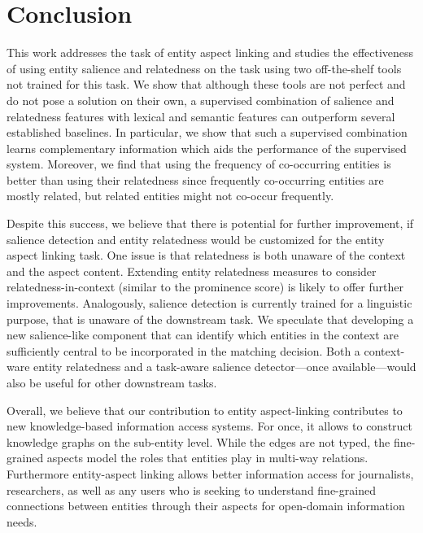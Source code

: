 \section{Conclusion}
\label{sec:Conclusion}
This work addresses the task of entity aspect linking and studies the effectiveness of using entity salience and relatedness on the task using two off-the-shelf tools not trained for this task. We show that although these tools are not perfect and do not pose a solution on their own, a supervised combination of salience and relatedness features with lexical and semantic features can outperform several established baselines. In particular, we show that such a supervised combination learns complementary information which aids the performance of the supervised system. Moreover, we find that using the frequency of co-occurring entities is better than using their relatedness since frequently co-occurring entities are mostly related, but related entities might not co-occur frequently. 

Despite this success, we believe that there is potential for further improvement, if salience detection and entity relatedness would be customized for the entity aspect linking task. One issue is that relatedness is both unaware of the context and the aspect content. Extending entity relatedness measures to consider relatedness-in-context (similar to the prominence score) is likely to offer further improvements. Analogously, salience detection is currently trained for a linguistic purpose, that is unaware of the downstream task. We speculate that developing a new salience-like component that can identify which entities in the context are sufficiently central to be incorporated in the matching decision. Both a context-ware entity relatedness and a task-aware salience detector---once available---would also be useful for other downstream tasks.

Overall, we believe that our contribution to entity aspect-linking contributes to new knowledge-based information access systems. For once, it allows to construct knowledge graphs on the sub-entity level. While the edges are not typed, the fine-grained aspects model the roles that entities play in multi-way relations. Furthermore entity-aspect linking allows better information access for journalists, researchers, as well as any users who is seeking to understand fine-grained connections between entities through their aspects for open-domain information needs.